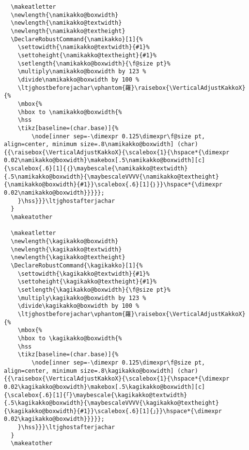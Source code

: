 \documentclass[luatex,fontsize=10pt,paper=b5,twoside]{jlreq}%
\begin{document}
\begin{lstlisting}
  \makeatletter
  \newlength{\namikakko@boxwidth}
  \newlength{\namikakko@textwidth}
  \newlength{\namikakko@textheight}
  \DeclareRobustCommand{\namikakko}[1]{%
    \settowidth{\namikakko@textwidth}{#1}%
    \settoheight{\namikakko@textheight}{#1}%
    \setlength{\namikakko@boxwidth}{\f@size pt}%
    \multiply\namikakko@boxwidth by 123 %
    \divide\namikakko@boxwidth by 100 %
    \ltjghostbeforejachar\vphantom{羅}\raisebox{\VerticalAdjustKakkoX}{%
    \mbox{%
    \hbox to \namikakko@boxwidth{%
    \hss
    \tikz[baseline=(char.base)]{%
        \node[inner sep=-\dimexpr 0.125\dimexpr\f@size pt, align=center, minimum size=.8\namikakko@boxwidth] (char) {{\raisebox{\VerticalAdjustKakkoX}{\scalebox{1}{\hspace*{\dimexpr 0.02\namikakko@boxwidth}\makebox[.5\namikakko@boxwidth][c]{\scalebox{.6}[1]{｛}\maybescale{\namikakko@textwidth}{.5\namikakko@boxwidth}{\maybescaleVVVV{\namikakko@textheight}{\namikakko@boxwidth}{#1}}\scalebox{.6}[1]{｝}}\hspace*{\dimexpr 0.02\namikakko@boxwidth}}}}};
    }\hss}}}\ltjghostafterjachar
  }
  \makeatother

  \makeatletter
  \newlength{\kagikakko@boxwidth}
  \newlength{\kagikakko@textwidth}
  \newlength{\kagikakko@textheight}
  \DeclareRobustCommand{\kagikakko}[1]{%
    \settowidth{\kagikakko@textwidth}{#1}%
    \settoheight{\kagikakko@textheight}{#1}%
    \setlength{\kagikakko@boxwidth}{\f@size pt}%
    \multiply\kagikakko@boxwidth by 123 %
    \divide\kagikakko@boxwidth by 100 %
    \ltjghostbeforejachar\vphantom{羅}\raisebox{\VerticalAdjustKakkoX}{%
    \mbox{%
    \hbox to \kagikakko@boxwidth{%
    \hss
    \tikz[baseline=(char.base)]{%
        \node[inner sep=-\dimexpr 0.125\dimexpr\f@size pt, align=center, minimum size=.8\kagikakko@boxwidth] (char) {{\raisebox{\VerticalAdjustKakkoX}{\scalebox{1}{\hspace*{\dimexpr 0.02\kagikakko@boxwidth}\makebox[.5\kagikakko@boxwidth][c]{\scalebox{.6}[1]{「}\maybescale{\kagikakko@textwidth}{.5\kagikakko@boxwidth}{\maybescaleVVVV{\kagikakko@textheight}{\kagikakko@boxwidth}{#1}}\scalebox{.6}[1]{」}}\hspace*{\dimexpr 0.02\kagikakko@boxwidth}}}}};
    }\hss}}}\ltjghostafterjachar
  }
  \makeatother


\end{lstlisting}
\end{document}
